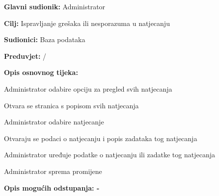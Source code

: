 						\begin{packed_item}
							
							\item \textbf{Glavni sudionik: } Administrator
							\item  \textbf{Cilj:} Ispravljanje grešaka ili nesporazuma u natjecanju
							\item  \textbf{Sudionici:} Baza podataka
							\item  \textbf{Preduvjet:}  / 
							\item  \textbf{Opis osnovnog tijeka:}
							
							\item[] \begin{packed_enum}
								\item Administrator odabire opciju za pregled svih natjecanja
								\item Otvara se stranica s popisom svih natjecanja
								\item Administrator odabire natjecanje		
								\item Otvaraju se podaci o natjecanju i popis zadataka tog natjecanja
								\item Administrator uređuje podatke o natjecanju ili zadatke tog natjecanja
								\item Administrator sprema promijene
							\end{packed_enum}
							
							\item  \textbf{Opis mogućih odstupanja: - } 
							
							
						\end{packed_item}
					\noindent {}
